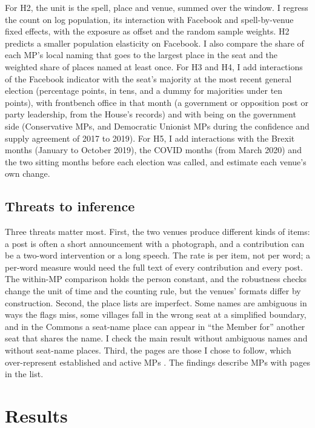 \documentclass[11pt,a4paper]{article}
\begin{document}
For H2, the unit is the spell, place and venue, summed over the window. I regress the count on log population, its interaction with Facebook and spell-by-venue fixed effects, with the exposure as offset and the random sample weights. H2 predicts a smaller population elasticity on Facebook. I also compare the share of each MP's local naming that goes to the largest place in the seat and the weighted share of places named at least once. For H3 and H4, I add interactions of the Facebook indicator with the seat's majority at the most recent general election (percentage points, in tens, and a dummy for majorities under ten points), with frontbench office in that month (a government or opposition post or party leadership, from the House's records) and with being on the government side (Conservative MPs, and Democratic Unionist MPs during the confidence and supply agreement of 2017 to 2019). For H5, I add interactions with the Brexit months (January to October 2019), the COVID months (from March 2020) and the two sitting months before each election was called, and estimate each venue's own change.

\subsection{Threats to inference}
Three threats matter most. First, the two venues produce different kinds of items: a post is often a short announcement with a photograph, and a contribution can be a two-word intervention or a long speech. The rate is per item, not per word; a per-word measure would need the full text of every contribution and every post. The within-MP comparison holds the person constant, and the robustness checks change the unit of time and the counting rule, but the venues' formats differ by construction. Second, the place lists are imperfect. Some names are ambiguous in ways the flags miss, some villages fall in the wrong seat at a simplified boundary, and in the Commons a seat-name place can appear in ``the Member for'' another seat that shares the name. I check the main result without ambiguous names and without seat-name places. Third, the pages are those I chose to follow, which over-represent established and active MPs \citep{hotham2027}. The findings describe MPs with pages in the list.

\section{Results}\label{sec:results}
\end{document}
